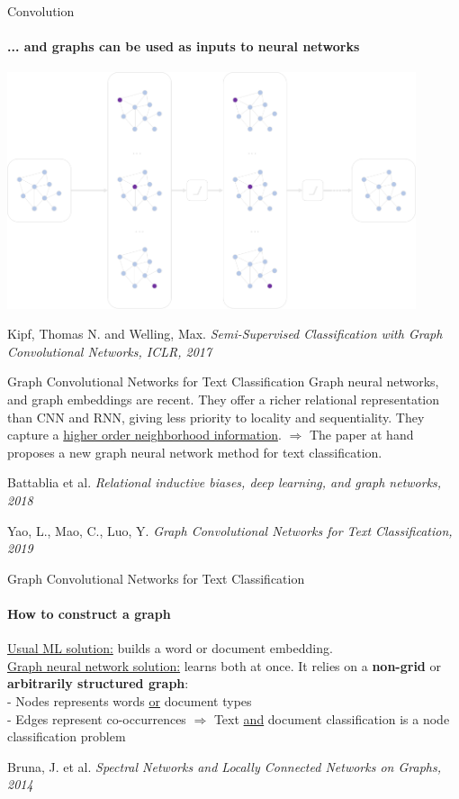 \documentclass{beamer}
\begin{document}
\begin{darkframes}
    \begin{frame}[label=lists]{Convolution}
        \framesubtitle{... and graphs can be used as inputs to neural networks}
        \centering\includegraphics[width=0.9\textwidth]{fibeamer/logo/zut/graph.png}
        \clearpage
        \raggedright\tiny{Kipf, Thomas N. and Welling, Max. \emph{Semi-Supervised Classification with Graph Convolutional Networks, ICLR, 2017}}
    \end{frame}

    \begin{frame}[label=lists]{\large{Graph Convolutional Networks for Text Classification}}
        Graph neural networks, and graph embeddings are recent.
        \clearpage
        They offer a richer relational representation than CNN and RNN, giving less priority to locality and sequentiality.\clearpage
        They capture a \underline{higher order neighborhood information}.
        \clearpage
        \clearpage
        $\Rightarrow$ The paper at hand proposes a new graph neural network method for text classification.
        \clearpage
        \clearpage
        \raggedright\tiny{Battablia et al. \emph{Relational inductive biases, deep learning, and graph networks, 2018}}\\
        \raggedright\tiny{Yao, L., Mao, C., Luo, Y. \emph{Graph Convolutional Networks for Text Classification, 2019}}
    \end{frame}
    
    \begin{frame}[label=lists]{\large{Graph Convolutional Networks for Text Classification}}
        \framesubtitle{How to construct a graph}
        \underline{Usual ML solution:} builds a word or document embedding.\\
        \underline{Graph neural network solution:} learns both at once.
        \clearpage
        \clearpage
        It relies on a \textbf{non-grid} or \textbf{arbitrarily structured graph}:\\
        \quad - Nodes represents words \underline{or} document types\\
        \quad - Edges represent co-occurrences
        \clearpage
        \clearpage
        $\Rightarrow$ Text \underline{and} document classification is a node classification problem
        \clearpage
        \clearpage
        \raggedright\tiny{Bruna, J. et al. \emph{Spectral Networks and Locally Connected Networks on Graphs, 2014}}
    \end{frame}
    

\end{darkframes}
\end{document}
